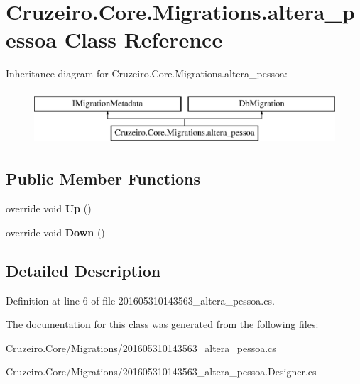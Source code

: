\hypertarget{class_cruzeiro_1_1_core_1_1_migrations_1_1altera__pessoa}{}\section{Cruzeiro.\+Core.\+Migrations.\+altera\+\_\+pessoa Class Reference}
\label{class_cruzeiro_1_1_core_1_1_migrations_1_1altera__pessoa}
Inheritance diagram for Cruzeiro.\+Core.\+Migrations.\+altera\+\_\+pessoa\+:\begin{figure}[H]
\begin{center}
\leavevmode
\includegraphics[height=2.000000cm]{class_cruzeiro_1_1_core_1_1_migrations_1_1altera__pessoa}
\end{center}
\end{figure}
\subsection*{Public Member Functions}
\begin{DoxyCompactItemize}
\item 
override void {\bfseries Up} ()\hypertarget{class_cruzeiro_1_1_core_1_1_migrations_1_1altera__pessoa_aa9bfebe8ca48af36271f06852d0b538e}{}\label{class_cruzeiro_1_1_core_1_1_migrations_1_1altera__pessoa_aa9bfebe8ca48af36271f06852d0b538e}

\item 
override void {\bfseries Down} ()\hypertarget{class_cruzeiro_1_1_core_1_1_migrations_1_1altera__pessoa_ac9102bb315a625990aac2c98b078a7e8}{}\label{class_cruzeiro_1_1_core_1_1_migrations_1_1altera__pessoa_ac9102bb315a625990aac2c98b078a7e8}

\end{DoxyCompactItemize}


\subsection{Detailed Description}


Definition at line 6 of file 201605310143563\+\_\+altera\+\_\+pessoa.\+cs.



The documentation for this class was generated from the following files\+:\begin{DoxyCompactItemize}
\item 
Cruzeiro.\+Core/\+Migrations/201605310143563\+\_\+altera\+\_\+pessoa.\+cs\item 
Cruzeiro.\+Core/\+Migrations/201605310143563\+\_\+altera\+\_\+pessoa.\+Designer.\+cs\end{DoxyCompactItemize}
